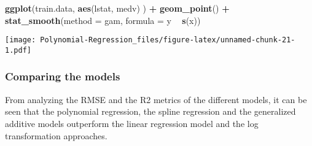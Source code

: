 \documentclass[]{article}
\newenvironment{Shaded}{\begin{snugshade}}{\end{snugshade}}
\newcommand{\DataTypeTok}[1]{\textcolor[rgb]{0.13,0.29,0.53}{#1}}
\newcommand{\KeywordTok}[1]{\textcolor[rgb]{0.13,0.29,0.53}{\textbf{#1}}}
\newcommand{\NormalTok}[1]{#1}
\newcommand{\OperatorTok}[1]{\textcolor[rgb]{0.81,0.36,0.00}{\textbf{#1}}}
\newcommand{\StringTok}[1]{\textcolor[rgb]{0.31,0.60,0.02}{#1}}
\begin{document}
\begin{Shaded}
\begin{Highlighting}[]
\KeywordTok{ggplot}\NormalTok{(train.data, }\KeywordTok{aes}\NormalTok{(lstat, medv) ) }\OperatorTok{+}
\StringTok{  }\KeywordTok{geom_point}\NormalTok{() }\OperatorTok{+}
\StringTok{  }\KeywordTok{stat_smooth}\NormalTok{(}\DataTypeTok{method =}\NormalTok{ gam, }\DataTypeTok{formula =}\NormalTok{ y }\OperatorTok{~}\StringTok{ }\KeywordTok{s}\NormalTok{(x))}
\end{Highlighting}
\end{Shaded}

\texttt{[image: Polynomial-Regression\_files/figure-latex/unnamed-chunk-21-1.pdf]}

\hypertarget{comparing-the-models}{%
\subsubsection{Comparing the models}\label{comparing-the-models}}

From analyzing the RMSE and the R2 metrics of the different models, it
can be seen that the polynomial regression, the spline regression and
the generalized additive models outperform the linear regression model
and the log transformation approaches.
\end{document}
